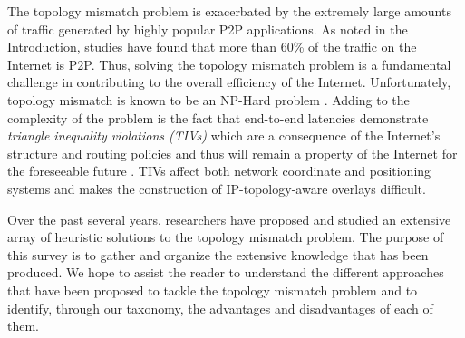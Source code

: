 The topology mismatch problem is exacerbated by the extremely large
amounts of traffic
generated by highly popular P2P applications. As noted in the Introduction,
studies have found that more than 60\% of the traffic on the Internet is
P2P.  Thus, solving the topology mismatch problem is a fundamental challenge
in contributing to the overall
efficiency of the Internet.  Unfortunately, topology mismatch is
known to be an NP-Hard problem \cite{NPBOOK,chawathe_scattercast_2000}.
Adding to the complexity of the problem is the fact that end-to-end latencies 
demonstrate \emph{triangle inequality violations
(TIVs)} which are a 
consequence of the Internet's structure and routing policies and thus will
remain a property of the Internet for the foreseeable future
\cite{zheng_irprtt_2005}. TIVs affect both network coordinate
\cite{cox_vivaldi_2004,wong_meridian_2005} and positioning \cite{ng_gnp_2001}
systems 
and makes the construction of IP-topology-aware overlays difficult. 

Over the past several years, researchers have proposed and studied 
an extensive array of heuristic solutions to the topology 
mismatch problem.
The purpose of this
survey is to gather and organize the extensive knowledge that has been produced. 
We hope to assist the reader
to understand the different approaches that have been proposed to tackle
the topology mismatch problem and to identify, through our taxonomy, the
advantages and disadvantages of each of them.  


%
%
%

